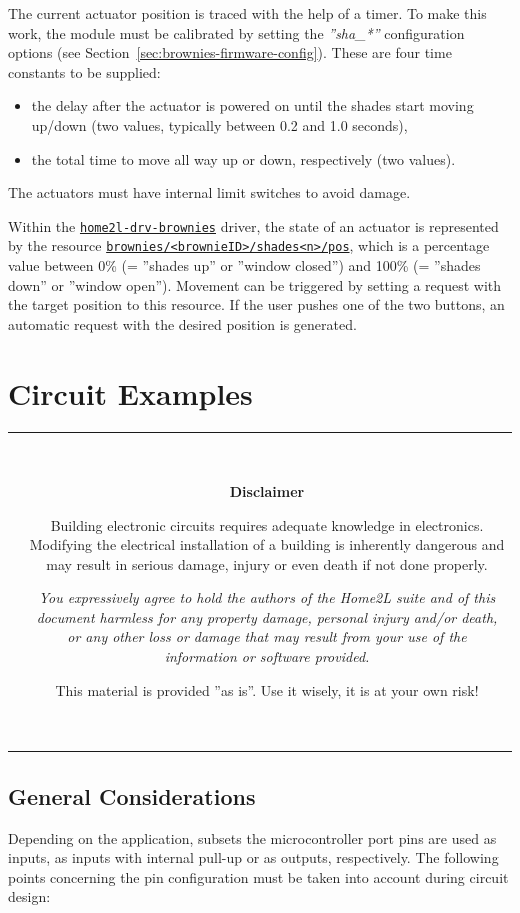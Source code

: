\documentclass[12pt,english,parskip=half,headheight=19pt]{scrreprt}
\newcommand{\warnbox}[1]{
  \par
  \medskip
  \hfill
  \setlength\arrayrulewidth{1pt}
  \begin{tabular}[b]{c|c|}
    
    &
    \,\parbox{0.89\linewidth}{\setlength{\parskip}{0.5em}#1}\,
  \end{tabular}
  \medskip
  \par
}
\newcommand{\eshockdisclaimer}{
  \warnbox{\textbf{Disclaimer}

    Building electronic circuits requires adequate knowledge in electronics.
    Modifying the electrical installation of a building is inherently dangerous and may result in
    serious damage, injury or even death if not done properly.

    \textit{You expressively agree to hold the authors of the \textit{Home2L} suite and of this
    document harmless for any property damage, personal injury and/or death, or any other loss or
    damage that may result from your use of the information or software provided.}

    This material is provided ''as is''. Use it wisely, it is at your own risk!
  }
}
\newcommand{\idx}[1]{#1\index{#1}}
\newcommand{\refrc}[1]{\hyperref[rc:#1]{\texttt{#1}}}
\newcommand{\reftool}[1]{\hyperref[tool:#1]{\texttt{\idx{#1}}}}
\begin{document}
The current actuator position is traced with the help of a timer. To make this work, the module must be calibrated by setting the \textit{''sha\_*''} configuration options (see Section~\ref{sec:brownies-firmware-config}). These are four time constants to be supplied:
\begin{itemize}
  \item the delay after the actuator is powered on until the shades start moving up/down
        (two values, typically between 0.2 and 1.0 seconds),
  \item the total time to move all way up or down, respectively (two values).
\end{itemize}

The actuators must have internal limit switches to avoid damage.

Within the \reftool{home2l-drv-brownies} driver, the state of an actuator is represented by the resource \refrc{brownies/<brownieID>/shades<n>/pos}, which is a percentage value between 0\% (= ''shades up'' or ''window closed'') and 100\% (= ''shades down'' or ''window open''). Movement can be triggered by setting a request with the target position to this resource. If the user pushes one of the two buttons, an automatic request with the desired position is generated.





\section{Circuit Examples}
\label{sec:brownies-circuits}


\eshockdisclaimer



\subsection{General Considerations}

Depending on the application, subsets the microcontroller port pins are used as inputs, as inputs with internal pull-up or as outputs, respectively.
The following points concerning the pin configuration must be taken into account during circuit design:
\end{document}

